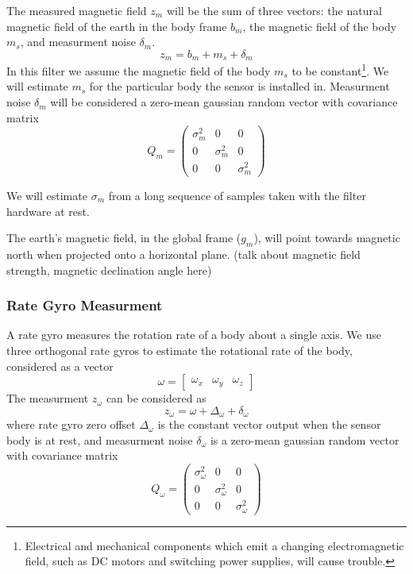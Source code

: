 \documentclass[12pt]{report}
\begin{document}
The measured magnetic field $z_m$ will be the sum of three vectors: the natural magnetic field of the earth in the body frame $b_m$, the magnetic field of the body $m_s$, and measurment noise $\delta_m$.
\begin{equation} \label{eq:zm}
  z_m = b_m + m_s + \delta_m
\end{equation}
In this filter we assume the magnetic field of the body $m_s$ to be constant\footnote{Electrical and mechanical components which emit a changing electromagnetic field, such as DC motors and switching power supplies, will cause trouble.}. We will estimate $m_s$ for the particular body the sensor is installed in. Measurment noise $\delta_m$ will be considered a zero-mean gaussian random vector with covariance matrix
\begin{equation} \label{eq:Qm}
  Q_m = \begin{pmatrix} \sigma_m^2 & 0 & 0 \\
	                      0 & \sigma_m^2 & 0 \\ 
	                      0 & 0 & \sigma_m^2 \end{pmatrix} 
\end{equation}

We will estimate $\sigma_m$ from a long sequence of samples taken with the filter hardware at rest.

The earth's magnetic field, in the global frame ($g_m$), will point towards magnetic north when projected onto a horizontal plane. (talk about magnetic field strength, magnetic declination angle here)


\subsubsection{Rate Gyro Measurment}

A rate gyro measures the rotation rate of a body about a single axis. We use three orthogonal rate gyros to estimate the rotational rate of the body, considered as a vector
\begin{equation} \label{eq:omega}
	\omega = \begin{bmatrix} \omega_x & \omega_y & \omega_z \end{bmatrix}
\end{equation}
The measurment $z_\omega$ can be considered as
\begin{equation} \label{eq:zomega}
	z_\omega = \omega + \Delta_\omega + \delta_\omega
\end{equation}
where rate gyro zero offset $\Delta_\omega$ is the constant vector output when the sensor body is at rest,
and measurment noise $\delta_\omega$ is a zero-mean gaussian random vector with covariance matrix
\begin{equation} \label{eq:Qomega}
	Q_\omega = \begin{pmatrix} \sigma_\omega^2 & 0 & 0 \\
	                      0 & \sigma_\omega^2 & 0 \\ 
	                      0 & 0 & \sigma_\omega^2 \end{pmatrix} 
\end{equation}
\end{document}
